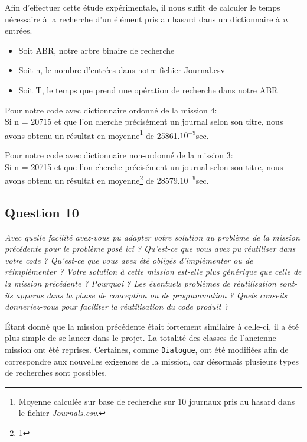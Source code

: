 \documentclass[11pt]{article}
\begin{document}
Afin d'effectuer cette étude expérimentale, il nous suffit de calculer le temps nécessaire à la recherche d'un élément pris au hasard dans un dictionnaire à \textit{n} entrées.
\begin{itemize}
\item Soit ABR, notre arbre binaire de recherche
\item Soit n, le nombre d'entrées dans notre fichier Journal.csv
\item Soit T, le temps que prend une opération de recherche dans notre ABR
\end{itemize}

\bigskip

Pour notre code avec dictionnaire ordonné de la mission 4: \\
Si n = 20715 et que l'on cherche précisément un journal selon son titre, nous avons obtenu un résultat en moyenne\footnote{\label{test}Moyenne calculée sur base de recherche sur 10 journaux pris au hasard dans le fichier \textit{Journals.csv}.} de 25861.$10^{-9}$sec. 

\bigskip

Pour notre code avec dictionnaire non-ordonné de la mission 3: \\
Si n = 20715 et que l'on cherche précisément un journal selon son titre, nous avons obtenu un résultat en moyenne\footnote{\ref{test}} de 28579.$10^{-9}$sec. 
\subsection*{Question 10}
\textit{Avec quelle facilité avez-vous pu adapter votre solution au problème de la mission précédente pour le problème posé ici ? Qu’est-ce que vous avez pu réutiliser dans votre code ? Qu’est-ce que vous avez été obligés d’implémenter ou de réimplémenter ? Votre solution à cette mission est-elle plus générique que celle de la mission précédente ? Pourquoi ? Les éventuels problèmes de réutilisation sont-ils apparus dans la phase de conception ou de programmation ? Quels conseils donneriez-vous pour faciliter la réutilisation du code produit ?} \\ \medskip

Étant donné que la mission précédente était fortement similaire à celle-ci, il a été plus simple de se lancer dans le projet. 
La totalité des classes de l'ancienne mission ont été reprises. Certaines, comme \verb+Dialogue+, ont été modifiées afin de correspondre aux nouvelles exigences de la mission, car désormais plusieurs types de recherches sont possibles. 
\end{document}
